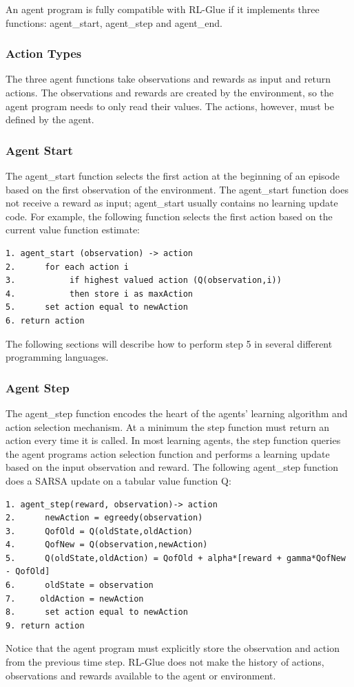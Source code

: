 \documentclass[11pt]{article}
\begin{document}
An agent program is fully compatible with RL-Glue if it implements three functions: agent\_start, agent\_step and agent\_end. 

\subsubsection{Action Types}
The three agent functions take observations and rewards as input and return actions. The observations and rewards are created by the environment, so the agent program needs to only read their values. The actions, however, must be defined by the agent.

\subsubsection{Agent Start}
The agent\_start function selects the first action at the beginning of an episode based on the first observation of the environment. The agent\_start function does not receive a reward as input; agent\_start usually contains no learning update code. For example, the following function selects the first action based on the current value function estimate:
\begin{verbatim}
1. agent_start (observation) -> action
2.      for each action i
3.           if highest valued action (Q(observation,i))
4.           then store i as maxAction
5.      set action equal to newAction
6. return action
\end{verbatim}
The following sections will describe how to perform step 5 in several different programming languages.

\subsubsection{Agent Step}
The agent\_step function encodes the heart of the agents' learning algorithm and action selection mechanism. At a minimum the step function must return an action every time it is called. In most learning agents, the step function queries the agent programs action selection function and performs a learning update based on the input observation and reward. The following agent\_step function does a SARSA update on a tabular value function Q:
\begin{verbatim}
1. agent_step(reward, observation)-> action
2.      newAction = egreedy(observation)
3.      QofOld = Q(oldState,oldAction)
4.      QofNew = Q(observation,newAction) 
5.      Q(oldState,oldAction) = QofOld + alpha*[reward + gamma*QofNew - QofOld]
6.      oldState = observation
7.     oldAction = newAction
8.      set action equal to newAction
9. return action
\end{verbatim}  
Notice that the agent program must explicitly store the observation and action from the previous time step. RL-Glue does not make the history of actions, observations and rewards available to the agent or environment.
\end{document}
